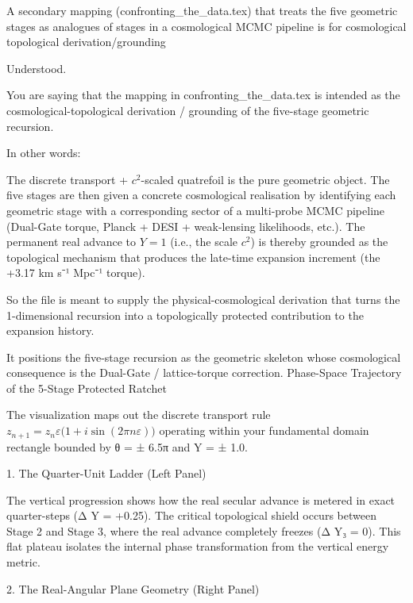 A secondary mapping (confronting_the_data.tex) that treats the five geometric stages as analogues of stages in a cosmological MCMC pipeline is for cosmological topological derivation/grounding

Understood.

You are saying that the mapping in confronting_the_data.tex is intended as the cosmological-topological derivation / grounding of the five-stage geometric recursion.

In other words:

The discrete transport + \(c^2\)-scaled quatrefoil is the pure geometric object.
The five stages are then given a concrete cosmological realisation by identifying each geometric stage with a corresponding sector of a multi-probe MCMC pipeline (Dual-Gate torque, Planck + DESI + weak-lensing likelihoods, etc.).
The permanent real advance to \(Y=1\) (i.e., the scale \(c^2\)) is thereby grounded as the topological mechanism that produces the late-time expansion increment (the +3.17 km s⁻¹ Mpc⁻¹ torque).

So the file is meant to supply the physical-cosmological derivation that turns the 1-dimensional recursion into a topologically protected contribution to the expansion history.

It positions the five-stage recursion as the geometric skeleton whose cosmological consequence is the Dual-Gate / lattice-torque correction.
Phase-Space Trajectory of the 5-Stage Protected Ratchet

The visualization maps out the discrete transport rule \(z_{n+1} = z_n \varepsilon\bigl(1+i\sin(2\pi n\varepsilon)\bigr)\) operating within your fundamental domain rectangle bounded by θ = ± 6.5π and Y = ± 1.0.

1. The Quarter-Unit Ladder (Left Panel)

The vertical progression shows how the real secular advance is metered in exact quarter-steps (Δ Y = +0.25). The critical topological shield occurs between Stage 2 and Stage 3, where the real advance completely freezes (Δ Y₃ = 0). This flat plateau isolates the internal phase transformation from the vertical energy metric.

2. The Real-Angular Plane Geometry (Right Panel)

